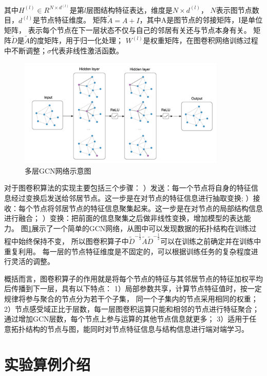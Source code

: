 \noindent 其中$H^{(l)} \in R^{N \times d^{(l)}}$是第$l$层图结构特征表达，维度是$N \times d^{(l)}$，
$N$表示图节点数目，$d^{(l)}$是节点特征维度。
矩阵$\tilde{A} = A + I$，其中A是图节点的邻接矩阵，I是单位矩阵，
表示每个节点在下一层状态不仅与自己的邻居有关还与节点本身有关。
矩阵$\tilde{D}$是$\tilde{A}$的度矩阵，用于归一化处理；
$W^{(l)}$是权重矩阵，在图卷积网络训练过程中不断调整；$\sigma$代表非线性激活函数。

\begin{figure}[htp]
	\centering
	\includegraphics[width=0.88\textwidth]{figures/GCN.png}
	\caption{多层GCN网络示意图}
	\label{fig:gcn}
\end{figure}

对于图卷积算法的实现主要包括三个步骤：
）发送：每一个节点将自身的特征信息经过变换后发送给邻居节点。这一步是在对节点的特征信息进行抽取变换;
）接收：每个节点将邻居节点的特征信息聚集起来。这一步是在对节点的局部结构信息进行融合；
）变换：把前面的信息聚集之后做非线性变换，增加模型的表达能力。
图\ref{fig:gcn}展示了一个简单的GCN网络，从图中可以发现数据的拓扑结构在训练过程中始终保持不变，
所以图卷积算子中$\tilde{D}^{-\frac{1}{2}} \tilde{A} \tilde{D}^{-\frac{1}{2}}$可以在训练之前确定并在训练中重复利用。
每一层的节点特征维度是不固定的，可以根据训练任务的复杂程度进行灵活的调整。

概括而言，图卷积算子的作用就是将每个节点的特征与其邻居节点的特征加权平均后传播到下一层，具有以下特点：
1）局部参数共享，计算节点特征值时，按一定规律将参与聚合的节点分为若干个子集，
同一个子集内的节点采用相同的权重；
2）节点感受域正比于层数，每一层图卷积运算只能和相邻的节点进行特征聚合；通过增加GCN层数，每个节点上参与运算的其他节点信息就更多；
3）适用于任意拓扑结构的节点与图，能同时对节点特征信息与结构信息进行端对端学习。


\section{实验算例介绍}

